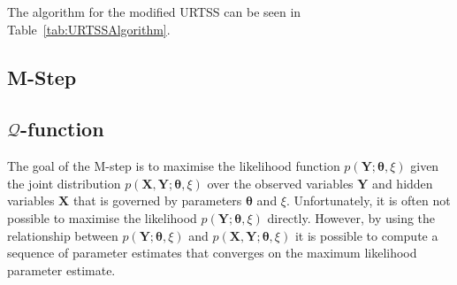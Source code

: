 \documentclass[]{article}
\begin{document}
The algorithm for the modified URTSS can be seen in Table~\ref{tab:URTSSAlgorithm}.

\subsection{M-Step}


\subsection{$\mathcal Q$-function}
The goal of the M-step is to maximise the likelihood function $p(\mathbf Y;\boldsymbol \theta,\xi)$ given the joint distribution $p(\mathbf X,\mathbf Y;\boldsymbol \theta,\xi)$ over the observed variables $\mathbf Y$ and hidden variables $\mathbf X$ that is governed by parameters $\boldsymbol \theta$ and $\xi$. Unfortunately, it is often not possible to maximise the likelihood $p(\mathbf Y;\boldsymbol \theta,\xi)$ directly. However, by using the relationship between $p(\mathbf Y;\boldsymbol \theta,\xi)$ and $p(\mathbf X,\mathbf Y;\boldsymbol \theta,\xi)$ it is possible to compute a sequence of parameter estimates that converges on the maximum likelihood parameter estimate. 
\end{document}
